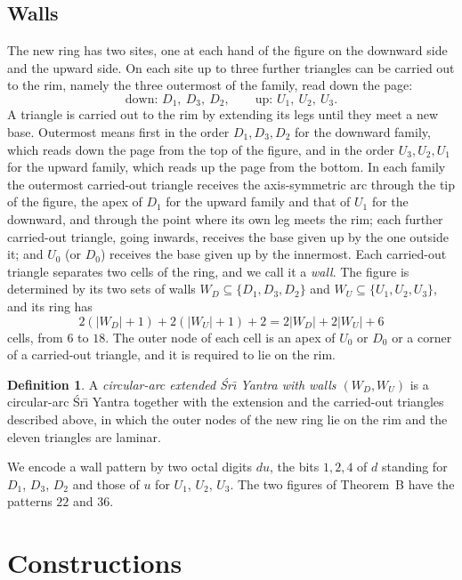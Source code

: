 \documentclass[11pt,a4paper]{article}
\theoremstyle{definition}
\newtheorem{definition}[theorem]{Definition}
\theoremstyle{remark}
\newcommand{\Sri}{\'Sr\={\i}}
\begin{document}
\subsection{Walls}\label{sec:walls}
The new ring has two sites, one at each hand of the figure on the downward side and the upward side. On
each site up to three further triangles can be carried out to the rim, namely the three outermost of the
family, read down the page:
\[
\text{down: } D_1,\ D_3,\ D_2, \qquad \text{up: } U_1,\ U_2,\ U_3 .
\]
A triangle is carried out to the rim by extending its legs until they meet a new base. Outermost means
first in the order $D_1, D_3, D_2$ for the downward family, which reads down the page from the top of the
figure, and in the order $U_3, U_2, U_1$ for the upward family, which reads up the page from the bottom.
In each family the outermost carried-out triangle receives the axis-symmetric arc through the tip of the figure, the apex of
$D_1$ for the upward family and that of $U_1$ for the downward, and through the point where its own leg
meets the rim; each further carried-out triangle, going inwards, receives the base given up by the one
outside it; and $U_0$ (or $D_0$) receives the base given up by the innermost. Each carried-out triangle
separates two cells of the ring, and we call it a \emph{wall}. The figure is determined by its two sets of
walls $W_D \subseteq \{D_1, D_3, D_2\}$ and $W_U \subseteq \{U_1, U_2, U_3\}$, and its ring has
\[
  2(|W_D| + 1) + 2(|W_U| + 1) + 2 = 2|W_D| + 2|W_U| + 6
\]
cells, from $6$ to $18$. The outer node of each cell is an apex of $U_0$ or $D_0$ or a corner of a
carried-out triangle, and it is required to lie on the rim.

\begin{definition}\label{def:arcext}
A \emph{circular-arc extended \Sri{} Yantra with walls $(W_D, W_U)$} is a circular-arc \Sri{} Yantra
together with the extension and the carried-out triangles described above, in which the outer nodes of
the new ring lie on the rim and the eleven triangles are laminar.
\end{definition}

We encode a wall pattern by two octal digits $du$, the bits $1, 2, 4$ of $d$ standing for $D_1$, $D_3$,
$D_2$ and those of $u$ for $U_1$, $U_2$, $U_3$. The two figures of Theorem~B have the patterns $22$ and
$36$.

\section{Constructions}\label{sec:constructions}
\end{document}

